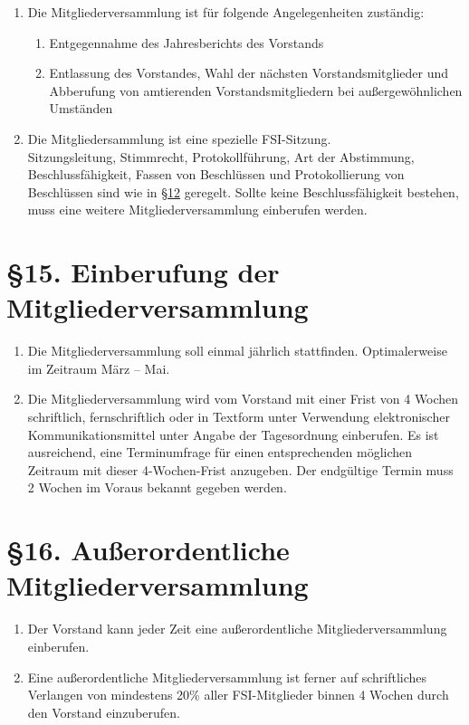 \documentclass[12pt]{article}
\begin{document}
\begin{enumerate}

	\item
	Die Mitgliederversammlung ist für folgende Angelegenheiten
	zuständig:
	\begin{enumerate}[label=(\roman*)]
		\item
		Entgegennahme des Jahresberichts des Vorstands
		\item
		Entlassung des Vorstandes, Wahl der nächsten Vorstandsmitglieder
		und Abberufung von amtierenden Vorstandsmitgliedern bei außergewöhnlichen
		Umständen
	\end{enumerate}

	\item
	\label{10.1_Stimmrecht}
	Die Mitgliedersammlung ist eine spezielle FSI-Sitzung. \\
		Sitzungsleitung, Stimmrecht, Protokollführung, Art der Abstimmung, Beschlussfähigkeit,
		Fassen von Beschlüssen und Protokollierung von Beschlüssen sind wie in
		\hyperref[12]{§12} geregelt. Sollte keine Beschlussfähigkeit bestehen, muss eine weitere
		Mitgliederversammlung einberufen werden.
\end{enumerate}

\section*{§15. Einberufung der Mitgliederversammlung}

\begin{enumerate}
	\item
	Die Mitgliederversammlung soll einmal jährlich stattfinden.
	Optimalerweise im Zeitraum März – Mai.
	\item
	Die Mitgliederversammlung wird vom Vorstand mit einer Frist von
	4 Wochen schriftlich, fernschriftlich oder in Textform unter
	Verwendung elektronischer Kommunikationsmittel unter Angabe der
	Tagesordnung einberufen. Es ist ausreichend, eine Terminumfrage
	für einen entsprechenden möglichen Zeitraum mit dieser
	4-Wochen-Frist anzugeben. Der endgültige Termin muss 2
	Wochen im Voraus bekannt gegeben werden.
\end{enumerate}


\section*{§16. Außerordentliche Mitgliederversammlung}

\begin{enumerate}
	\item
	Der Vorstand kann jeder Zeit eine außerordentliche
	Mitgliederversammlung einberufen.
	\item
	Eine außerordentliche Mitgliederversammlung ist ferner auf
	schriftliches Verlangen von mindestens 20\% aller
	FSI-Mitglieder binnen 4 Wochen durch den Vorstand
	einzuberufen.
\end{enumerate}
\end{document}
